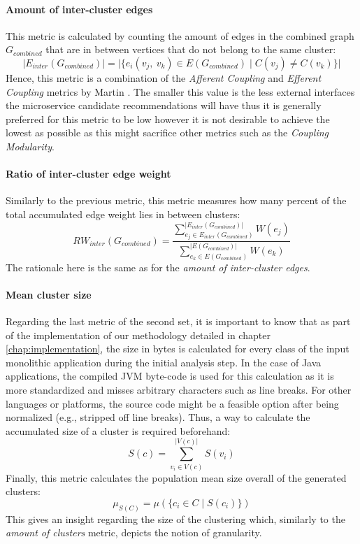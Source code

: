 \documentclass[12pt,a4paper]{report}
\begin{document}
\paragraph{Amount of inter-cluster edges} This metric is calculated by counting
the amount of edges in the combined graph \(G_{combined}\) that are in between
vertices that do not belong to the same cluster:
\[
  \vert E_{inter}(G_{combined}) \vert =
  \vert \{ e_i(v_j, \ v_k) \in E(G_{combined}) \mid C(v_j) \neq C(v_k) \} \vert
\]
Hence, this metric is a combination of the \textit{
Afferent Coupling} and \textit{Efferent Coupling} metrics by Martin
\cite{martin2000design}. The smaller this value is the less external interfaces the
microservice candidate recommendations will have thus it is generally preferred
for this metric to be low however it is not desirable to achieve the lowest as
possible as this might sacrifice other metrics such as the \textit{Coupling
Modularity}.

\paragraph{Ratio of inter-cluster edge weight}
Similarly to the previous
metric, this metric measures how many percent of the total accumulated edge
weight lies in between clusters:
\[
  RW_{inter}(G_{combined}) =
  \frac{
    \sum_{e_j \in E_{inter}(G_{combined})}^{\vert E_{inter}(G_{combined}) \vert} W(e_j)
  }{
    \sum_{e_k \in E(G_{combined})}^{\vert E(G_{combined}) \vert} W(e_k)
  }
\]
The rationale here is the same as for the \textit{amount of inter-cluster edges}.

\paragraph{Mean cluster size}
Regarding the last metric of the second set, it
is important to know that as part of the implementation of our methodology
detailed in chapter \ref{chap:implementation}, the size in bytes is calculated
for every class of the input monolithic application during the initial analysis
step. In the case of Java applications, the compiled JVM byte-code is used for
this calculation as it is more standardized and misses arbitrary characters
such as line breaks. For other languages or platforms, the source code might be
a feasible option after being normalized (e.g., stripped off line breaks).
Thus, a way to calculate the accumulated size of a cluster is required
beforehand:
\[
  S(c) = \sum_{v_i \in V(c)}^{\vert V(c) \vert} S(v_i)
\]
Finally, this metric calculates the population mean size overall of the generated
clusters:
\[
  \mu_{S(C)} = \mu(\{ c_i \in C \mid S(c_i) \})
\]
This gives an insight regarding the size of the clustering which, similarly to the
\textit{amount of clusters} metric, depicts the notion of granularity.
\end{document}

